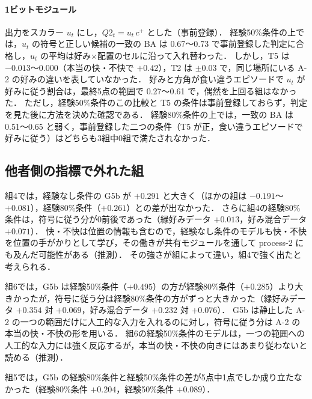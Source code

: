 \paragraph{1ビットモジュール}
出力をスカラー $u_t$ にし，$Q2_t=u_t\,c^{+}$ とした（事前登録）．
経験50\%条件の上では，$u_t$ の符号と正しい候補の一致の BA は 0.67〜0.73 で事前登録した判定に合格し，$u_t$ の平均は好み×配置のセルに沿って入れ替わった．
しかし，T5 は $-0.013$〜$0.000$（本当の快・不快で $+0.42$），T2 は $\pm0.03$ で，同じ場所にいる A-2 の好みの違いを表していなかった．
好みと方角が食い違うエピソードで $u_t$ が好みに従う割合は，最終5点の範囲で 0.27〜0.61 で，偶然を上回る組はなかった．
ただし，経験50\%条件のこの比較と T5 の条件は事前登録しておらず，判定を見た後に方法を決めた確認である．
経験80\%条件の上では，一致の BA は 0.51〜0.65 と弱く，事前登録した二つの条件（T5 が正，食い違うエピソードで好みに従う）はどちらも3組中0組で満たされなかった．

\subsection{他者側の指標で外れた組}
組4では，経験なし条件の G5b が $+0.291$ と大きく（ほかの組は $-0.191$〜$+0.081$），経験80\%条件（$+0.261$）との差が出なかった．
さらに組4の経験80\%条件は，符号に従う分が0前後であった（緑好みデータ $+0.013$，好み混合データ $+0.071$）．
快・不快は位置の情報も含むので，経験なし条件のモデルも快・不快を位置の手がかりとして学び，その働きが共有モジュールを通して process-2 にも及んだ可能性がある（推測）．
その強さが組によって違い，組4で強く出たと考えられる．

組6では，G5b は経験50\%条件（$+0.495$）の方が経験80\%条件（$+0.285$）より大きかったが，符号に従う分は経験80\%条件の方がずっと大きかった（緑好みデータ $+0.354$ 対 $+0.069$，好み混合データ $+0.232$ 対 $+0.076$）．
G5b は静止した A-2 の一つの範囲だけに人工的な入力を入れるのに対し，符号に従う分は A-2 の本当の快・不快の形を用いる．
組6の経験50\%条件のモデルは，一つの範囲への人工的な入力には強く反応するが，本当の快・不快の向きにはあまり従わないと読める（推測）．

組5では，G5b の経験80\%条件と経験50\%条件の差が5点中1点でしか成り立たなかった（経験80\%条件 $+0.204$，経験50\%条件 $+0.089$）．

